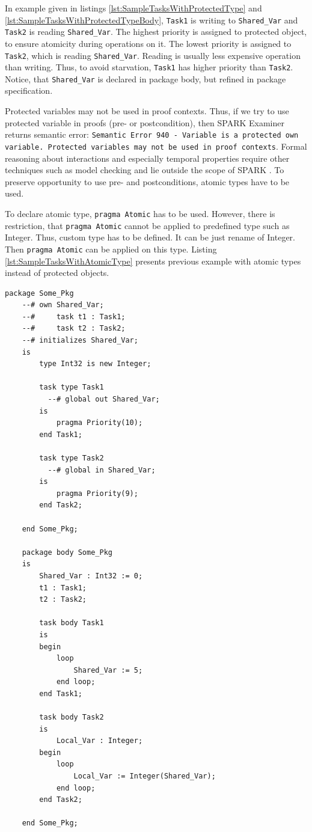 In example given in listings \ref{lst:SampleTasksWithProtectedType} and \ref{lst:SampleTasksWithProtectedTypeBody}, \lstinline{Task1} is writing to \lstinline{Shared_Var} and \lstinline{Task2} is reading \lstinline{Shared_Var}. The highest priority is assigned to protected object, to ensure atomicity during operations on it. The lowest priority is assigned to \lstinline{Task2}, which is reading \lstinline{Shared_Var}. Reading is usually less expensive operation than writing. Thus, to avoid starvation, \lstinline{Task1} has higher priority than \lstinline{Task2}. Notice, that \lstinline{Shared_Var} is declared in package body, but refined in package specification.

Protected variables may not be used in proof contexts. Thus, if we try to use protected variable in proofs (pre- or postcondition), then SPARK Examiner returns semantic error: \lstinline{Semantic Error 940 - Variable is a protected own variable. Protected variables may not be used in proof contexts}. Formal reasoning about interactions and especially temporal properties require other techniques such as model checking and lie outside the scope of SPARK \cite{Barnes:Book}. To preserve opportunity to use pre- and postconditions, atomic types have to be used.

To declare atomic type, \lstinline{pragma Atomic} has to be used. However, there is restriction, that \lstinline{pragma Atomic} cannot be applied to predefined type such as Integer. Thus, custom type has to be defined. It can be just rename of Integer. Then \lstinline{pragma Atomic} can be applied on this type. Listing \ref{lst:SampleTasksWithAtomicType} presents previous example with atomic types instead of protected objects.

\singlespacing
\begin{lstlisting}[frame=single, gobble=0, caption={Sample tasks with atomic type}, label={lst:SampleTasksWithAtomicType}]
	package Some_Pkg
	--# own Shared_Var;
	--#     task t1 : Task1;
	--#     task t2 : Task2;
	--# initializes Shared_Var;
	is
	    type Int32 is new Integer;
	    
	    task type Task1
	      --# global out Shared_Var;
	    is
	        pragma Priority(10);
	    end Task1;

	    task type Task2
	      --# global in Shared_Var;
	    is
	        pragma Priority(9);
	    end Task2;

	end Some_Pkg;

	package body Some_Pkg
	is    
	    Shared_Var : Int32 := 0;
	    t1 : Task1;
	    t2 : Task2;

	    task body Task1
	    is
	    begin
	        loop
	            Shared_Var := 5;
	        end loop;
	    end Task1;

	    task body Task2
	    is
	        Local_Var : Integer;
	    begin
	        loop
	            Local_Var := Integer(Shared_Var);
	        end loop;
	    end Task2;

	end Some_Pkg;
\end{lstlisting}
\doublespacing

